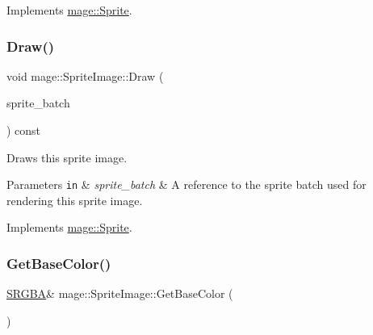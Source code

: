 Implements \hyperlink{classmage_1_1_sprite_a214890d7da493bccadb2327b8c7ffb09}{mage\+::\+Sprite}.

\hypertarget{classmage_1_1_sprite_image_ae30d3293931f674fea17008063755bb6}{}\label{classmage_1_1_sprite_image_ae30d3293931f674fea17008063755bb6} 
\subsubsection{\texorpdfstring{Draw()}{Draw()}}
{\footnotesize\ttfamily void mage\+::\+Sprite\+Image\+::\+Draw (\begin{DoxyParamCaption}\item[{\hyperlink{classmage_1_1_sprite_batch}{Sprite\+Batch} \&}]{sprite\+\_\+batch }\end{DoxyParamCaption}) const\hspace{0.3cm}{\ttfamily [virtual]}}

Draws this sprite image.


\begin{DoxyParams}[1]{Parameters}
\mbox{\tt in}  & {\em sprite\+\_\+batch} & A reference to the sprite batch used for rendering this sprite image. \\
\hline
\end{DoxyParams}


Implements \hyperlink{classmage_1_1_sprite_a954a9f2046edcd6b1658a236ae23ec5a}{mage\+::\+Sprite}.

\hypertarget{classmage_1_1_sprite_image_a0362a937253ba7a5cd944210aafd9288}{}\label{classmage_1_1_sprite_image_a0362a937253ba7a5cd944210aafd9288} 
\subsubsection{\texorpdfstring{Get\+Base\+Color()}{GetBaseColor()}\hspace{0.1cm}{\footnotesize\ttfamily [1/2]}}
{\footnotesize\ttfamily \hyperlink{structmage_1_1_s_r_g_b_a}{S\+R\+G\+BA}\& mage\+::\+Sprite\+Image\+::\+Get\+Base\+Color (\begin{DoxyParamCaption}{ }\end{DoxyParamCaption})\hspace{0.3cm}{\ttfamily [noexcept]}}

